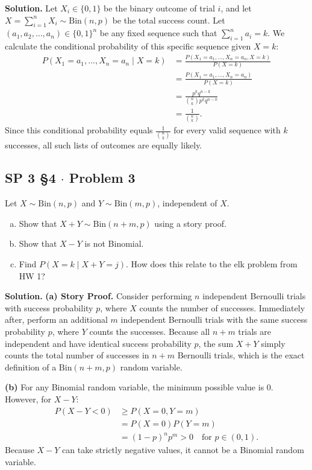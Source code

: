 \documentclass[11pt,a4paper]{article}
\begin{document}
\noindent \textbf{Solution.} Let $X_i \in \{0, 1\}$ be the binary outcome of trial $i$, and let $X = \sum_{i=1}^{n} X_i \sim \text{Bin}(n, p)$ be the total success count. Let $(a_1, a_2, \dots, a_n) \in \{0, 1\}^n$ be any fixed sequence such that $\sum_{i=1}^{n} a_i = k$. We calculate the conditional probability of this specific sequence given $X = k$:
\begin{align*}
P(X_1 = a_1, \dots, X_n = a_n \mid X = k) &= \frac{P(X_1 = a_1, \dots, X_n = a_n, X = k)}{P(X = k)} \\
&= \frac{P(X_1 = a_1, \dots, X_n = a_n)}{P(X = k)} \\
&= \frac{p^k q^{n-k}}{\binom{n}{k} p^k q^{n-k}} \\
&= \frac{1}{\binom{n}{k}}.
\end{align*}
Since this conditional probability equals $\frac{1}{\binom{n}{k}}$ for every valid sequence with $k$ successes, all such lists of outcomes are equally likely.

\vspace{10pt}
\subsection{SP 3 \S4 $\cdot$ Problem 3}
\begin{tcolorbox}[title={SP 3 \S4 $\cdot$ Problem 3}]
Let $X \sim \text{Bin}(n, p)$ and $Y \sim \text{Bin}(m, p)$, independent of $X$.
\begin{enumerate}[(a)]
\item Show that $X + Y \sim \text{Bin}(n+m, p)$ using a story proof.
\item Show that $X - Y$ is not Binomial.
\item Find $P(X = k \mid X + Y = j)$. How does this relate to the elk problem from HW 1?
\end{enumerate}
\end{tcolorbox}

\noindent \textbf{Solution.} \textbf{(a) Story Proof.} Consider performing $n$ independent Bernoulli trials with success probability $p$, where $X$ counts the number of successes. Immediately after, perform an additional $m$ independent Bernoulli trials with the same success probability $p$, where $Y$ counts the successes. Because all $n + m$ trials are independent and have identical success probability $p$, the sum $X + Y$ simply counts the total number of successes in $n + m$ Bernoulli trials, which is the exact definition of a $\text{Bin}(n+m, p)$ random variable.

\vspace{4pt}
\noindent \textbf{(b)} For any Binomial random variable, the minimum possible value is $0$. However, for $X - Y$:
\begin{align*}
P(X - Y < 0) &\ge P(X = 0, Y = m) \\
&= P(X = 0) P(Y = m) \\
&= (1-p)^n p^m > 0 \quad \text{for } p \in (0,1).
\end{align*}
Because $X - Y$ can take strictly negative values, it cannot be a Binomial random variable.
\end{document}
